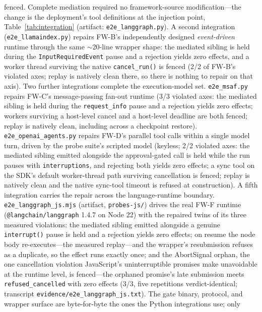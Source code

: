 \documentclass[10pt,journal,compsoc]{IEEEtran}
\begin{document}
fenced. Complete mediation required no framework-source modification---the
change is the deployment's tool definitions at the injection point,
Table~\ref{tab:integration} (artifact:
\texttt{e2e\_langgraph.py}). A second integration
(\texttt{e2e\_llamaindex.py}) repairs \textsf{FW-B}'s independently
designed \emph{event-driven} runtime through the same ${\sim}$20-line
wrapper shape: the mediated sibling is held during the
\texttt{InputRequiredEvent} pause and a rejection yields zero effects, and
a worker thread surviving the native \texttt{cancel\_run()} is fenced
(2/2 of \textsf{FW-B}'s violated axes; replay is natively clean there, so
there is nothing to repair on that axis). Two further integrations complete the execution-model set.
\texttt{e2e\_msaf.py} repairs \textsf{FW-C}'s message-passing fan-out
runtime (3/3 violated axes: the mediated sibling is held during the
\texttt{request\_info} pause and a rejection yields zero effects; workers
surviving a host-level cancel and a host-level deadline are both fenced;
replay is natively clean, including across a checkpoint restore).
\texttt{e2e\_openai\_agents.py} repairs \textsf{FW-D}'s parallel tool calls
within a single model turn, driven by the probe suite's scripted model
(keyless; 2/2 violated axes: the mediated sibling emitted alongside the
approval-gated call is held while the run pauses with
\texttt{interruptions}, and rejecting both yields zero effects; a sync tool
on the SDK's default worker-thread path surviving cancellation is fenced;
replay is natively clean and the native sync-tool timeout is refused at
construction). A fifth integration carries the repair across the language-runtime
boundary. \texttt{e2e\_langgraph\_js.mjs} (artifact, \texttt{probes-js/})
drives the real \textsf{FW-F} runtime (\texttt{@langchain/langgraph} 1.4.7
on Node 22) with the repaired twins of its three measured violations: the
mediated sibling emitted alongside a genuine \texttt{interrupt()} pause is
held and a rejection yields zero effects; on resume the node body
re-executes---the measured replay---and the wrapper's resubmission refuses
as a duplicate, so the effect runs exactly once; and the \textsf{AbortSignal}
orphan, the one cancellation violation JavaScript's uninterruptible promises
make unavoidable at the runtime level, is fenced---the orphaned promise's
late submission meets \texttt{refused\_cancelled} with zero effects (3/3,
five repetitions verdict-identical; transcript
\texttt{evidence/e2e\_langgraph\_js.txt}). The gate binary, protocol, and
wrapper surface are byte-for-byte the ones the Python integrations use; only
\end{document}

